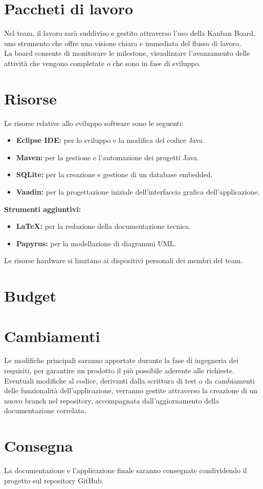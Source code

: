 \documentclass[a4paper,12pt]{article}
\begin{document}
\section{Paccheti di lavoro} %
Nel team, il lavoro sarà suddiviso e gestito attraverso l'uso della Kanban Board, uno strumento che offre una visione chiara e immediata del flusso di lavoro.\\ La board consente di monitorare le milestone, visualizzare l'avanzamento delle attività che vengono completate o che sono in fase di sviluppo.

\section{Risorse} %
Le risorse relative allo sviluppo software sono le seguenti:
\begin{itemize}
    \item \textbf{Eclipse IDE:} per lo sviluppo e la modifica del codice Java.
    \item \textbf{Maven:} per la gestione e l’automazione dei progetti Java.
    \item \textbf{SQLite:} per la creazione e gestione di un database embedded.
    \item \textbf{Vaadin:} per la progettazione iniziale dell’interfaccia grafica dell’applicazione.
\end{itemize}

\textbf{Strumenti aggiuntivi:}
\begin{itemize}
    \item \textbf{LaTeX:} per la redazione della documentazione tecnica.
    \item \textbf{Papyrus:} per la modellazione di diagrammi UML.
\end{itemize}

Le risorse hardware si limitano ai dispositivi personali dei membri del team.


\section{Budget} %

\section{Cambiamenti} %
Le modifiche principali saranno apportate durante la fase di ingegneria dei requisiti, per garantire un prodotto il più possibile aderente alle richieste. Eventuali modifiche al codice, derivanti dalla scrittura di test o da cambiamenti delle funzionalità dell'applicazione, verranno gestite attraverso la creazione di un nuovo branch nel repository, accompagnata dall'aggiornamento della documentazione correlata.

\section{Consegna} %
La documentazione e l'applicazione finale saranno consegnate condividendo il progetto sul repository GitHub.
\end{document}
